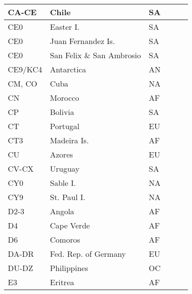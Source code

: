 \documentclass[a4paper]{article}
\begin{document}
\begin{longtable}{|p{1.5cm}|p{4cm}|l|p{2cm}|p{2cm}|p{2cm}|}
\hline
CA-CE                  & Chile                                      & SA    & & & \\
\hline
CE0                    & Easter I.                                  & SA    & & & \\
\hline
CE0                    & Juan Fernandez Is.                         & SA    & & & \\
\hline
CE0                    & San Felix \& San Ambrosio                  & SA    & & & \\
\hline
CE9/KC4                & Antarctica                                 & AN    & & & \\
\hline
CM, CO                 & Cuba                                       & NA    & & & \\
\hline
CN                     & Morocco                                    & AF    & & & \\
\hline
CP                     & Bolivia                                    & SA    & & & \\
\hline
CT                     & Portugal                                   & EU    & & & \\
\hline
CT3                    & Madeira Is.                                & AF    & & & \\
\hline
CU                     & Azores                                     & EU    & & & \\
\hline
CV-CX                  & Uruguay                                    & SA    & & & \\
\hline
CY0                    & Sable I.                                   & NA    & & & \\
\hline
CY9                    & St. Paul I.                                & NA    & & & \\
\hline
D2-3                   & Angola                                     & AF    & & & \\
\hline
D4                     & Cape Verde                                 & AF    & & & \\
\hline
D6                     & Comoros                                    & AF    & & & \\
\hline
DA-DR                  & Fed. Rep. of Germany                       & EU    & & & \\
\hline
DU-DZ                  & Philippines                                & OC    & & & \\
\hline
E3                     & Eritrea                                    & AF    & & & \\

\end{longtable}
\end{document}
